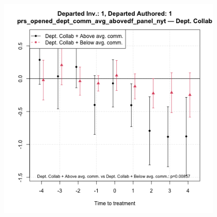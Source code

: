 \begin{figure}[htbp]
\begin{minipage}[b]{0.24\textwidth}
        \includegraphics[width=\textwidth]{temp/output/collab_imp/auth_n1_inv_n1_cs_norm_prs_opened_dept_comm_avg_above_Dept.Collab.png}
    \label{fig:prs_opened_comm_collab_comm_nonint}
    \end{minipage}



\end{figure}
